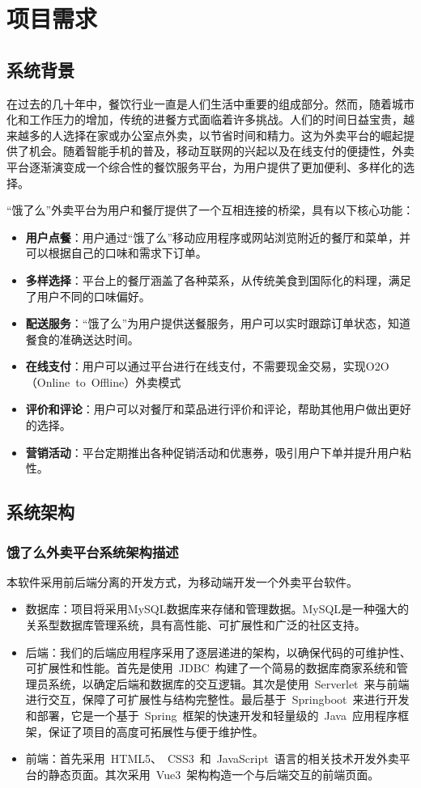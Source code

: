 \chapter{项目需求}

\section{系统背景}
在过去的几十年中，餐饮行业一直是人们生活中重要的组成部分。然而，随着城市化和工作压力的增加，传统的进餐方式面临着许多挑战。人们的时间日益宝贵，越来越多的人选择在家或办公室点外卖，以节省时间和精力。这为外卖平台的崛起提供了机会。随着智能手机的普及，移动互联网的兴起以及在线支付的便捷性，外卖平台逐渐演变成一个综合性的餐饮服务平台，为用户提供了更加便利、多样化的选择。

“饿了么”外卖平台为用户和餐厅提供了一个互相连接的桥梁，具有以下核心功能：
\begin{itemize}
    \item{\textbf{用户点餐}}：用户通过“饿了么”移动应用程序或网站浏览附近的餐厅和菜单，并可以根据自己的口味和需求下订单。
    \item{\textbf{多样选择}}：平台上的餐厅涵盖了各种菜系，从传统美食到国际化的料理，满足了用户不同的口味偏好。
    \item{\textbf{配送服务}}：“饿了么”为用户提供送餐服务，用户可以实时跟踪订单状态，知道餐食的准确送达时间。
    \item{\textbf{在线支付}}：用户可以通过平台进行在线支付，不需要现金交易，实现O2O（Online~to~Offline）外卖模式
    \item{\textbf{评价和评论}}：用户可以对餐厅和菜品进行评价和评论，帮助其他用户做出更好的选择。
    \item{\textbf{营销活动}}：平台定期推出各种促销活动和优惠券，吸引用户下单并提升用户粘性。
\end{itemize}

\section{系统架构}
\subsection{饿了么外卖平台系统架构描述}
本软件采用前后端分离的开发方式，为移动端开发一个外卖平台软件。
\begin{itemize}
    \item {数据库}：项目将采用MySQL数据库来存储和管理数据。MySQL是一种强大的关系型数据库管理系统，具有高性能、可扩展性和广泛的社区支持。
    \item {后端}：我们的后端应用程序采用了逐层递进的架构，以确保代码的可维护性、可扩展性和性能。首先是使用~JDBC~构建了一个简易的数据库商家系统和管理员系统，以确定后端和数据库的交互逻辑。其次是使用~Serverlet~来与前端进行交互，保障了可扩展性与结构完整性。最后基于~Springboot~来进行开发和部署，它是一个基于~Spring~框架的快速开发和轻量级的~Java~应用程序框架，保证了项目的高度可拓展性与便于维护性。
    \item {前端}：首先采用~HTML5、~CSS3~和~JavaScript~语言的相关技术开发外卖平台的静态页面。其次采用~Vue3~架构构造一个与后端交互的前端页面。
\end{itemize}

